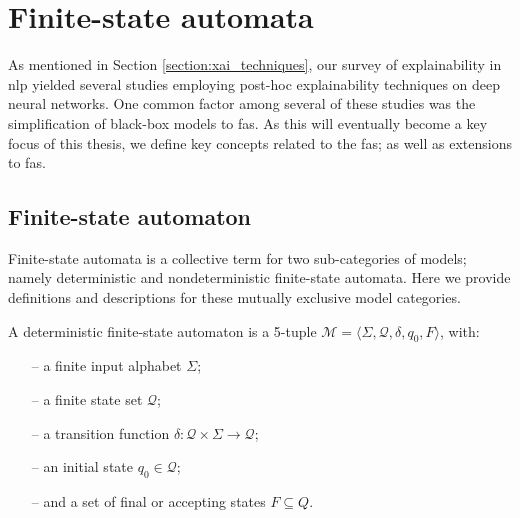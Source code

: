 \section{Finite-state automata}

\label{section:fa}

As mentioned in Section \ref{section:xai_techniques}, our survey of
explainability in \ac{nlp} yielded several studies employing post-hoc
explainability techniques on deep neural networks. One common factor among
several of these studies was the simplification of black-box models to
\ac{fas}. As this will eventually become a key focus of this
thesis, we define key concepts related to the \ac{fas}; as well as extensions to \ac{fas}.

\subsection{Finite-state automaton}

Finite-state automata is a collective term for two sub-categories of models;
namely deterministic and nondeterministic finite-state automata. Here we provide
definitions and descriptions for these mutually exclusive model categories.

\begin{definition}
  \label{def:fa}
  A deterministic finite-state automaton is a 5-tuple $\mathcal{M} = \langle
  \Sigma, \mathcal{Q}, \delta, q_0, F \rangle$, with:
  \begin{itemize}
    \itemsep0em
    \item[--] a finite input alphabet $\Sigma$;
    \item[--] a finite state set $\mathcal{Q}$;
    \item[--] a transition function $\delta: \mathcal{Q} \times \Sigma
    \rightarrow \mathcal{Q}$;
    \item[--] an initial state $q_0 \in \mathcal{Q}$;
    \item[--] and a set of final or accepting states $F \subseteq Q$.
  \end{itemize}
\end{definition}

